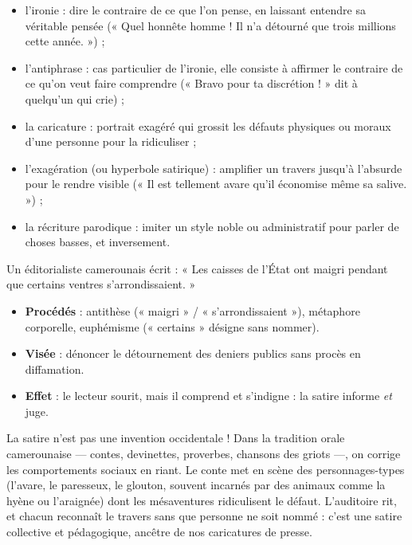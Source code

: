 \documentclass[11pt]{article}
\newcommand{\cle}[1]{{\popxbold\color{popdark}#1}}
\begin{document}
\begin{itemize}
\item l'\cle{ironie} : dire le contraire de ce que l'on pense, en laissant entendre sa véritable pensée (« Quel honnête homme ! Il n'a détourné que trois millions cette année. ») ;
\item l'\cle{antiphrase} : cas particulier de l'ironie, elle consiste à affirmer le contraire de ce qu'on veut faire comprendre (« Bravo pour ta discrétion ! » dit à quelqu'un qui crie) ;
\item la \cle{caricature} : portrait exagéré qui grossit les défauts physiques ou moraux d'une personne pour la ridiculiser ;
\item l'\cle{exagération} (ou hyperbole satirique) : amplifier un travers jusqu'à l'absurde pour le rendre visible (« Il est tellement avare qu'il économise même sa salive. ») ;
\item la \cle{récriture} parodique : imiter un style noble ou administratif pour parler de choses basses, et inversement.
\end{itemize}

\begin{exemplebox}
Un éditorialiste camerounais écrit : « Les caisses de l'État ont maigri pendant que certains ventres s'arrondissaient. »
\begin{itemize}
\item \textbf{Procédés} : antithèse (« maigri » / « s'arrondissaient »), métaphore corporelle, euphémisme (« certains » désigne sans nommer).
\item \textbf{Visée} : dénoncer le détournement des deniers publics sans procès en diffamation.
\item \textbf{Effet} : le lecteur sourit, mais il comprend et s'indigne : la satire informe \emph{et} juge.
\end{itemize}
\end{exemplebox}

\begin{savaistu}
La satire n'est pas une invention occidentale ! Dans la tradition orale camerounaise — contes, devinettes, proverbes, chansons des griots —, on corrige les comportements sociaux en riant. Le conte met en scène des personnages-types (l'avare, le paresseux, le glouton, souvent incarnés par des animaux comme la hyène ou l'araignée) dont les mésaventures ridiculisent le défaut. L'auditoire rit, et chacun reconnaît le travers sans que personne ne soit nommé : c'est une satire collective et pédagogique, ancêtre de nos caricatures de presse.
\end{savaistu}
\end{document}
